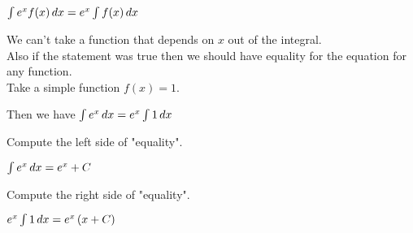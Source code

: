 \documentclass{ximera}
\author{Steven Gubkin}
\begin{document}
\begin{exercise}

$\int e^x f(x) \,d x= e^x \int f(x) \,d x$
\begin{hint}
We can't take a function that depends on $x$ out of the integral. \\
Also if the statement was true then we should have equality for the equation for any function. \\

Take a simple function $f(x)=1$. 

Then we have
$\int e^x  \,d x= e^x \int1 \,d x$

Compute the left  side of "equality".

$ \int e^x \,d x=e^x+C$

Compute the right  side of "equality".

$e^x \int1 \,d x=e^x\left(x+C\right)$
\end{hint}
	\begin{multipleChoice}	
	\end{multipleChoice}

\end{exercise}
\end{document}
